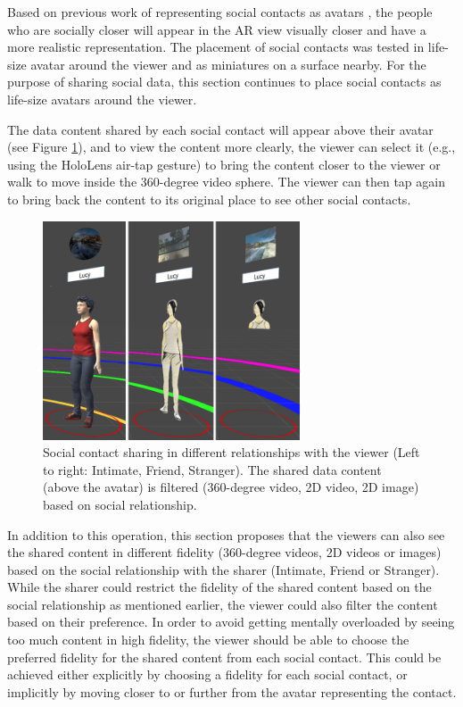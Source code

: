 Based on previous work of representing social contacts as avatars \cite{Nassani2017a}, the people who are socially closer will appear in the AR view visually closer and have a more realistic representation. The placement of social contacts was tested in life-size avatar around the viewer and as miniatures on a surface nearby. For the purpose of sharing social data, this section continues to place social contacts as life-size avatars around the viewer. 

The data content shared by each social contact will appear above their avatar (see Figure \ref{fig:data:viewer}), and to view the content more clearly, the viewer can select it (e.g., using the HoloLens air-tap gesture) to bring the content closer to the viewer or walk to move inside the 360-degree video sphere. The viewer can then tap again to bring back the content to its original place to see other social contacts. 

\begin{figure}[H]
    \centering
    \includegraphics[width=3in]{images/chi/3_levels_of_data.png}
    \caption{Social contact sharing in different relationships with the viewer (Left to right: Intimate, Friend, Stranger). The shared data content (above the avatar) is filtered (360-degree video, 2D video, 2D image) based on social relationship.}
      \label{fig:data:viewer}
\end{figure}

In addition to this operation, this section proposes that the viewers can also see the shared content in different fidelity (360-degree videos, 2D videos or images) based on the social relationship with the sharer (Intimate, Friend or Stranger). While the sharer could restrict the fidelity of the shared content based on the social relationship as mentioned earlier, the viewer could also filter the content based on their preference. In order to avoid getting mentally overloaded by seeing too much content in high fidelity, the viewer should be able to choose the preferred fidelity for the shared content from each social contact. This could be achieved either explicitly by choosing a fidelity for each social contact, or implicitly by moving closer to or further from the avatar representing the contact.

